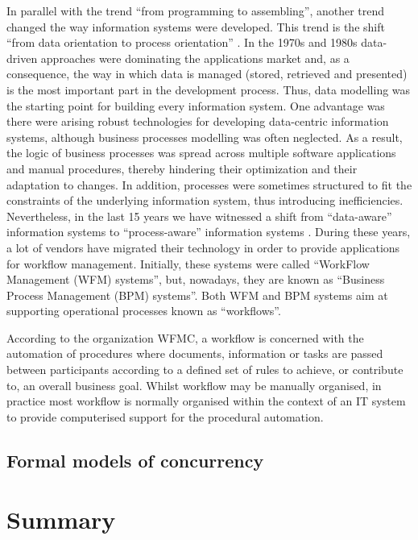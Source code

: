 In parallel with the trend ``from programming to assembling'', another trend
changed the way information systems were developed. This trend is the shift ``from
data orientation to process orientation'' \cite{DumasAalst2005}. In the 1970s and 1980s 
data-driven approaches were dominating
the applications market and, as a consequence, the way in which data is managed (stored, retrieved and presented) 
is the most important part in the development process. Thus, data
modelling was the starting point for building every information system. One advantage was there were arising
robust technologies for developing data-centric information systems, although 
business processes modelling was often neglected. As a 
result, the logic of business processes was spread across multiple software
applications and manual procedures, thereby hindering their optimization and their
adaptation to changes. In addition, processes were sometimes structured to fit the
constraints of the underlying information system, thus introducing inefficiencies.
Nevertheless, in the last 15 years we have witnessed a shift from ``data-aware'' 
information systems to ``process-aware'' information systems \cite{DumasAalst2005}.
During these years, a lot of vendors have migrated their technology in order to provide applications
for workflow management. Initially, these systems were called ``WorkFlow Management (WFM) systems'', but, nowadays,
they are known as ``Business Process Management (BPM) systems''. Both WFM and BPM systems aim at supporting operational
processes known as ``workflows''.

According to the organization WFMC, a workflow is concerned with the automation of procedures where documents, information or tasks are passed
between participants according to a defined set of rules to achieve, or contribute to, an overall business goal.
Whilst workflow may be manually organised, in practice most workflow is normally
organised within the context of an IT system to provide
computerised support for the procedural automation.


\subsection{Formal models of concurrency}\label{formalmodels}



%



\section{Summary}\label{sumArt}

